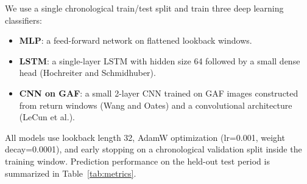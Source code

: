 We use a single chronological train/test split and train three deep learning classifiers:
\begin{itemize}
\item \textbf{MLP}: a feed-forward network on flattened lookback windows.
\item \textbf{LSTM}: a single-layer LSTM with hidden size 64 followed by a small dense head (Hochreiter and Schmidhuber).
\item \textbf{CNN on GAF}: a small 2-layer CNN trained on GAF images constructed from return windows (Wang and Oates) and a convolutional architecture (LeCun et al.).
\end{itemize}
All models use lookback length 32, AdamW optimization (lr=0.001, weight decay=0.0001), and early stopping on a chronological validation split inside the training window.
Prediction performance on the held-out test period is summarized in Table~\ref{tab:metrics}.
